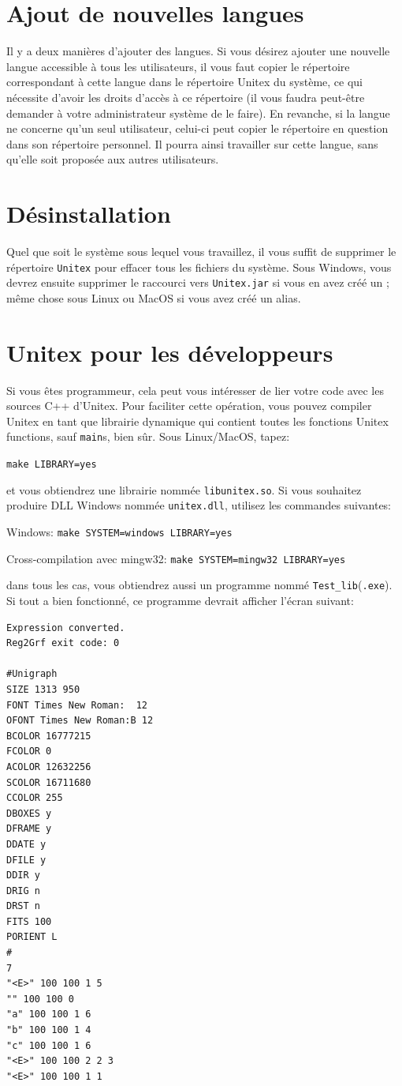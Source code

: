 \section{Ajout de nouvelles langues}

\bigskip
\noindent Il y a deux manières d’ajouter des langues. Si vous désirez ajouter une nouvelle langue
accessible à tous les utilisateurs, il vous faut copier le répertoire correspondant à cette langue
dans le répertoire Unitex du système, ce qui nécessite d’avoir les droits d’accès à ce répertoire
(il vous faudra peut-être demander à votre administrateur système de le faire).
En revanche, si la langue ne concerne qu’un seul utilisateur, celui-ci peut copier le répertoire
en question dans son répertoire personnel. Il pourra ainsi travailler sur cette langue, sans
qu’elle soit proposée aux autres utilisateurs.



\section{Désinstallation}
Quel que soit le système sous lequel vous travaillez, il vous suffit de supprimer le répertoire
\verb+Unitex+ pour effacer tous les fichiers du système. Sous Windows, vous devrez ensuite supprimer
le raccourci vers \verb+Unitex.jar+  si vous en avez créé un ;
même chose sous Linux ou MacOS si vous avez créé un alias.


\section{Unitex pour les développeurs}
\label{section-unitex-developpers}
Si vous êtes programmeur, cela peut vous intéresser de lier votre code avec les sources C++
d'Unitex. Pour faciliter cette opération, vous pouvez compiler Unitex en tant que librairie
dynamique qui contient toutes les fonctions Unitex functions, sauf \verb+main+s, bien sûr. Sous
Linux/MacOS, tapez:

\bigskip
\verb+make LIBRARY=yes+

\bigskip
\noindent et vous obtiendrez une librairie nommée \verb+libunitex.so+. Si vous souhaitez produire 
DLL Windows nommée \verb+unitex.dll+, utilisez les commandes suivantes:

\bigskip
Windows: \verb+make SYSTEM=windows LIBRARY=yes+

Cross-compilation avec mingw32: \verb+make SYSTEM=mingw32 LIBRARY=yes+

\bigskip
\noindent dans tous les cas, vous obtiendrez aussi un programme nommé
\verb+Test_lib+(\verb+.exe+). Si tout a bien fonctionné, ce programme devrait afficher l'écran
suivant:

\begin{verbatim}
Expression converted.
Reg2Grf exit code: 0

#Unigraph
SIZE 1313 950
FONT Times New Roman:  12
OFONT Times New Roman:B 12
BCOLOR 16777215
FCOLOR 0
ACOLOR 12632256
SCOLOR 16711680
CCOLOR 255
DBOXES y
DFRAME y
DDATE y
DFILE y
DDIR y
DRIG n
DRST n
FITS 100
PORIENT L
#
7
"<E>" 100 100 1 5
"" 100 100 0
"a" 100 100 1 6
"b" 100 100 1 4
"c" 100 100 1 6
"<E>" 100 100 2 2 3
"<E>" 100 100 1 1
\end{verbatim}
